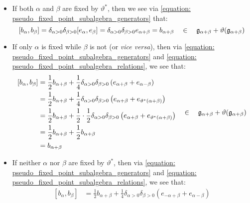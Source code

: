         \begin{itemize}
            \item If both $\alpha$ and $\beta$ are fixed by $\vartheta^*$, then we see via \eqref{equation: pseudo_fixed_point_subalgebra_generators} that:
                $$
                    [b_{\alpha}, b_{\beta}] = \delta_{\alpha > 0} \delta_{\beta > 0} [e_{\alpha}, e_{\beta}] = \delta_{\alpha > 0} \delta_{\beta > 0} e_{\alpha + \beta} = b_{\alpha + \beta} \quad \in \quad \g_{\alpha + \beta} + \vartheta(\g_{\alpha + \beta})
                $$
            \item If only $\alpha$ is fixed while $\beta$ is not (or \textit{vice versa}), then via \eqref{equation: pseudo_fixed_point_subalgebra_generators} and \eqref{equation: pseudo_fixed_point_subalgebra_relations}, we see that:
                $$
                    \begin{aligned}
                        [b_{\alpha}, b_{\beta}] & = \frac12 b_{\alpha + \beta} + \frac14 \delta_{\alpha > 0} \delta_{\beta > 0} \left( e_{\alpha + \beta} + e_{\alpha - \beta} \right)
                        \\
                        & = \frac12 b_{\alpha + \beta} + \frac14 \delta_{\alpha > 0} \delta_{\beta > 0} \left( e_{\alpha + \beta} + e_{\vartheta^*(\alpha + \beta)} \right)
                        \\
                        & = \frac12 b_{\alpha + \beta} + \frac12 \cdot \frac12 \delta_{\alpha > 0} \delta_{\beta > 0} \left( e_{\alpha + \beta} + e_{\vartheta^*(\alpha + \beta)} \right)
                        \\
                        & = \frac12 b_{\alpha + \beta} + \frac12 b_{\alpha + \beta}
                        \\
                        & = b_{\alpha + \beta}
                    \end{aligned}
                    \quad \in \quad \g_{\alpha + \beta} + \vartheta(\g_{\alpha + \beta})
                $$
            \item If neither $\alpha$ nor $\beta$ are fixed by $\vartheta^*$, then via \eqref{equation: pseudo_fixed_point_subalgebra_generators} and \eqref{equation: pseudo_fixed_point_subalgebra_relations}, we see that:
                $$
                    \begin{aligned}
                        [b_{\alpha}, b_{\beta}] & = \frac12 b_{\alpha + \beta} + \frac14 \delta_{\alpha > 0} \delta_{\beta > 0} \left( e_{-\alpha + \beta} + e_{\alpha - \beta} \right)
                        \\

\end{aligned}$$
\end{itemize}
